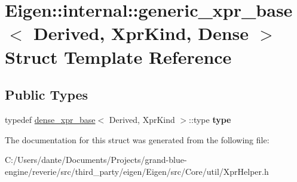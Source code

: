 \hypertarget{struct_eigen_1_1internal_1_1generic__xpr__base_3_01_derived_00_01_xpr_kind_00_01_dense_01_4}{}\section{Eigen\+::internal\+::generic\+\_\+xpr\+\_\+base$<$ Derived, Xpr\+Kind, Dense $>$ Struct Template Reference}
\label{struct_eigen_1_1internal_1_1generic__xpr__base_3_01_derived_00_01_xpr_kind_00_01_dense_01_4}
\subsection*{Public Types}
\begin{DoxyCompactItemize}
\item 
\mbox{\label{struct_eigen_1_1internal_1_1generic__xpr__base_3_01_derived_00_01_xpr_kind_00_01_dense_01_4_a4ed1633e4600ed266bb514233743d66e}} 
typedef \mbox{\hyperlink{struct_eigen_1_1internal_1_1dense__xpr__base}{dense\+\_\+xpr\+\_\+base}}$<$ Derived, Xpr\+Kind $>$\+::type {\bfseries type}
\end{DoxyCompactItemize}


The documentation for this struct was generated from the following file\+:\begin{DoxyCompactItemize}
\item 
C\+:/\+Users/dante/\+Documents/\+Projects/grand-\/blue-\/engine/reverie/src/third\+\_\+party/eigen/\+Eigen/src/\+Core/util/Xpr\+Helper.\+h\end{DoxyCompactItemize}
